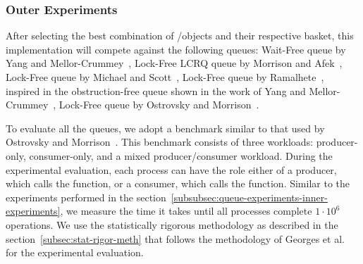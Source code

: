 \subsubsection{Outer Experiments}

After selecting the best combination of \LL/\IC objects and their respective basket, this implementation will compete against the following queues:  Wait-Free queue by Yang and Mellor-Crummey~\cite{DBLP_conf_ppopp_YangM16},  Lock-Free LCRQ queue by Morrison and Afek~\cite{ppopp2013x86queues}, Lock-Free queue by Michael and Scott~\cite{DBLP_conf_podc_MichaelS96}, Lock-Free queue by Ramalhete~\cite{Ramalhete_Correia_MPMC_2016}, inspired in the obstruction-free queue shown in the work of Yang and Mellor-Crummey~\cite{DBLP_conf_ppopp_YangM16}, Lock-Free queue by Ostrovsky and Morrison~\cite{scalingconcurrent2020}.

To evaluate all the queues, we adopt a benchmark similar to that used by Ostrovsky and Morrison~\cite{scalingconcurrent2020}. This benchmark consists of three workloads: producer-only, consumer-only, and a mixed producer/consumer workload. During the experimental evaluation, each process can have the role either of a producer, which calls the \Enq function, or a consumer, which calls the \Deq function. Similar to the experiments performed in the section~\ref{subsubsec:queue-experiments-inner-experiments}, we measure the time it takes until all processes complete \(1\cdot 10^6\) operations. We use the statistically rigorous methodology as described in the section~\ref{subsec:stat-rigor-meth} that follows the methodology of Georges et al.~\cite{DBLP_conf_oopsla_GeorgesBE07} for the experimental evaluation.
